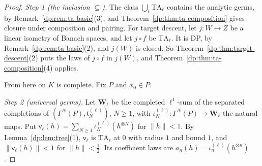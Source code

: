 \documentclass[11pt]{amsart}
\theoremstyle{definition}
\theoremstyle{remark}
\numberwithin{equation}{section}
\newcommand{\norm}[1]{\lVert #1\rVert}
\theoremstyle{plain}
\theoremstyle{definition}
\theoremstyle{plain}
\begin{document}
\begin{proof}
\emph{Step 1 (the inclusion $\subseteq$).} The class $\bigcup_\ell\mathrm{TA}_\ell$ contains the analytic germs, by Remark~\ref{dp:rem:ta-basic}(3), and Theorem~\ref{dp:thm:ta-composition} gives closure under composition and pairing. For target descent, let $j\colon W\to Z$ be a linear isometry of Banach spaces, and let $j\circ f$ be $\mathrm{TA}_\ell$. It is DP, by Remark~\ref{dp:rem:ta-basic}(2), and $j(W)$ is closed. So Theorem~\ref{dp:thm:target-descent}(2) puts the laws of $j\circ f$ in $j(W)$, and Theorem~\ref{dp:thm:ta-composition}(4) applies.

From here on $K$ is complete. Fix $P$ and $x_0\in P$.

\emph{Step 2 (universal germs).} Let $\mathbf W_\ell$ be the completed $\ell^1$-sum of the separated completions of $(\Gamma^N(P),\mathfrak t^{(\ell)}_N)$, $N\ge1$, with $\iota^{(\ell)}_N\colon\Gamma^N(P)\to\mathbf W_\ell$ the natural maps. Put $\mathsf v_\ell(h)=\sum_{N\ge1}\iota^{(\ell)}_N(h^{\otimes N})$ for $\norm h<1$. By Lemma~\ref{dp:lem:tree}(1), $\mathsf v_\ell$ is $\mathrm{TA}_\ell$ at $0$ with radius $1$ and bound $1$, and $\norm{\mathsf v_\ell(h)}<1$ for $\norm h<\frac12$. Its coefficient laws are $a_n(h)=\iota^{(\ell)}_n(h^{\otimes n})$.


\end{proof}
\end{document}
